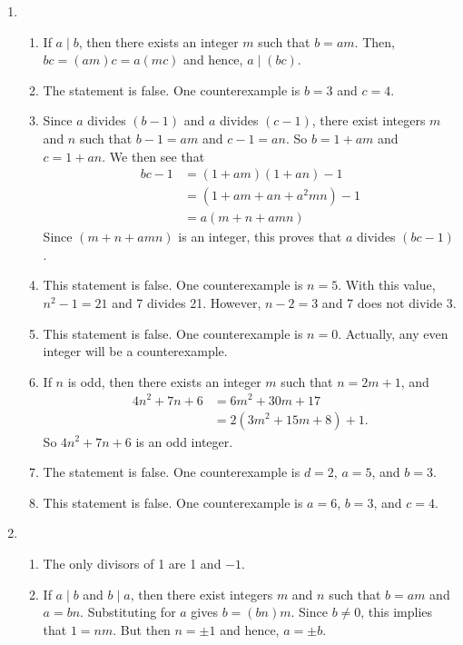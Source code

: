 \begin{enumerate}
\item \begin{enumerate}
\item If $a \mid b$, then there exists an integer $m$ such that $b = am$.  Then, \\
$bc = \left( am \right)c = a \left( mc \right)$ and hence, $a \mid \left( bc \right)$.

\item The statement is false.  One counterexample is $b = 3$ and $c = 4$.

\item Since $a$ divides $(b - 1)$ and $a$ divides $(c - 1)$, there exist integers $m$ and $n$ such that $b - 1 = am$ and $c - 1 = an$.  So $b = 1 + am$ and $c = 1 + an$.  We then see that
\begin{align*}
bc - 1 &= (1 + am)(1 + an) - 1 \\
       &= (1 + am + an + a^2 mn) - 1 \\
       &= a(m + n + amn)
\end{align*}
Since $(m + n + amn)$ is an integer, this proves that $a$ divides $(bc - 1)$.

\item This statement is false.  One counterexample is $n = 5$.  With this value, $n^2 - 1 = 21$ and 7 divides 21.  However, $n - 2 = 3$ and 7 does not divide 3.

\item This statement is false.  One counterexample is $n = 0$.  Actually, any even integer will be a counterexample.

\item If $n$ is odd, then there exists an integer $m$ such that $n = 2m + 1$, and
\begin{align*}
4n^2 + 7n + 6 &= 6m^2 + 30m + 17 \\
              &= 2 \left( 3m^2 + 15m + 8 \right) + 1.
\end{align*}
So $4n^2 + 7n + 6$ is an odd integer.

\item The statement is false.  One counterexample is $d = 2$, $a = 5$, and $b = 3$.

\item This statement is false.  One counterexample is $a = 6$, $b = 3$, and $c = 4$.
\end{enumerate}


\item \begin{enumerate}
\item The only divisors of 1 are 1 and $-1$.
\item If $a \mid b$ and $b \mid a$, then there exist integers $m$ and $n$ such that 
$b = am$ and $a = bn$.  Substituting for $a$ gives $b = \left( bn \right) m$.  Since $b \ne 0$, this implies that $1 = nm$.  But then $n = \pm 1$ and hence, $a = \pm b$.
\end{enumerate}



\end{enumerate}
